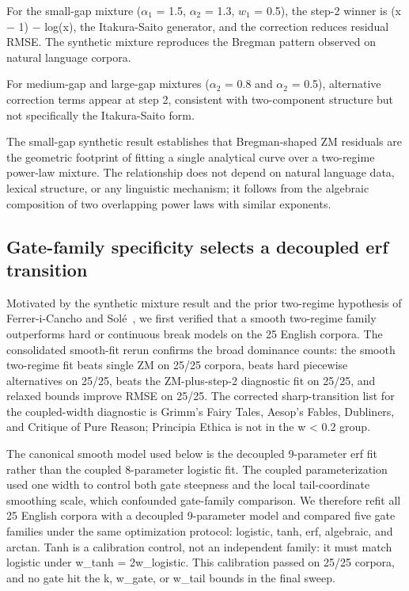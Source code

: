 \documentclass[11pt]{article}
\begin{document}
For the small-gap mixture ($\alpha_1$ = 1.5, $\alpha_2$ = 1.3, $w_1$ = 0.5), the step-2 winner is (x − 1) − log(x), the Itakura-Saito generator, and the correction reduces residual RMSE. The synthetic mixture reproduces the Bregman pattern observed on natural language corpora.

For medium-gap and large-gap mixtures ($\alpha_2$ = 0.8 and $\alpha_2$ = 0.5), alternative correction terms appear at step 2, consistent with two-component structure but not specifically the Itakura-Saito form.

The small-gap synthetic result establishes that Bregman-shaped ZM residuals are the geometric footprint of fitting a single analytical curve over a two-regime power-law mixture. The relationship does not depend on natural language data, lexical structure, or any linguistic mechanism; it follows from the algebraic composition of two overlapping power laws with similar exponents.

\subsection{Gate-family specificity selects a decoupled erf transition}\label{sec:3-5-gate}

Motivated by the synthetic mixture result and the prior two-regime hypothesis of Ferrer-i-Cancho and Solé~\cite{ferrer2001}, we first verified that a smooth two-regime family outperforms hard or continuous break models on the 25 English corpora. The consolidated smooth-fit rerun confirms the broad dominance counts: the smooth two-regime fit beats single ZM on 25/25 corpora, beats hard piecewise alternatives on 25/25, beats the ZM-plus-step-2 diagnostic fit on 25/25, and relaxed bounds improve RMSE on 25/25. The corrected sharp-transition list for the coupled-width diagnostic is Grimm's Fairy Tales, Aesop's Fables, Dubliners, and Critique of Pure Reason; Principia Ethica is not in the w < 0.2 group.

The canonical smooth model used below is the decoupled 9-parameter erf fit rather than the coupled 8-parameter logistic fit. The coupled parameterization used one width to control both gate steepness and the local tail-coordinate smoothing scale, which confounded gate-family comparison. We therefore refit all 25 English corpora with a decoupled 9-parameter model and compared five gate families under the same optimization protocol: logistic, tanh, erf, algebraic, and arctan. Tanh is a calibration control, not an independent family: it must match logistic under w\_tanh = 2w\_logistic. This calibration passed on 25/25 corpora, and no gate hit the k, w\_gate, or w\_tail bounds in the final sweep.
\end{document}
